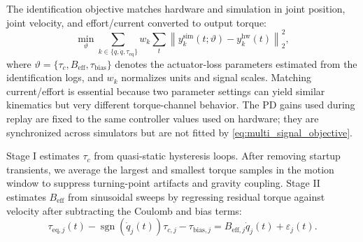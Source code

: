 \documentclass[twoside,final,1p,times]{elsarticle}
\begin{document}
The identification objective matches hardware and simulation in joint position, joint velocity, and effort/current converted to output torque:
\begin{equation}
  \min_{\vartheta}\sum_{k\in\{q,\dot q,\tau_{\mathrm{eq}}\}} w_k\sum_t \left\|y^{\mathrm{sim}}_k(t;\vartheta)-y^{\mathrm{hw}}_k(t)\right\|_2^2,
  \label{eq:multi_signal_objective}
\end{equation}
where $\vartheta=\{\tau_c,B_{\mathrm{eff}},\tau_{\mathrm{bias}}\}$ denotes the actuator-loss parameters estimated from the identification logs, and $w_k$ normalizes units and signal scales. Matching current/effort is essential because two parameter settings can yield similar kinematics but very different torque-channel behavior. The PD gains used during replay are fixed to the same controller values used on hardware; they are synchronized across simulators but are not fitted by \cref{eq:multi_signal_objective}.

Stage I estimates $\tau_c$ from quasi-static hysteresis loops. After removing startup transients, we average the largest and smallest torque samples in the motion window to suppress turning-point artifacts and gravity coupling. Stage II estimates $B_{\mathrm{eff}}$ from sinusoidal sweeps by regressing residual torque against velocity after subtracting the Coulomb and bias terms:
\begin{equation}
  \tau_{\mathrm{eq},j}(t)-\operatorname{sgn}(\dot q_j(t))\tau_{c,j}-\tau_{\mathrm{bias},j}=B_{\mathrm{eff},j}\dot q_j(t)+\varepsilon_j(t).
  \label{eq:damping_regression}
\end{equation}
\end{document}
